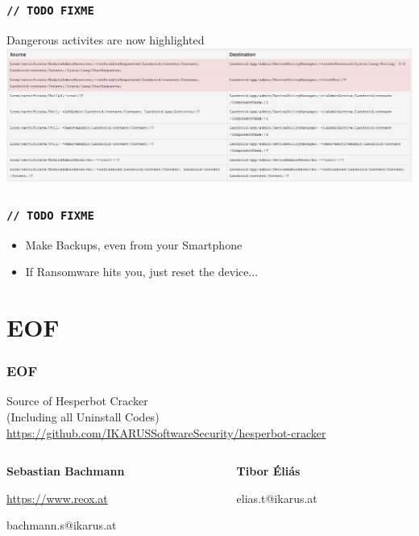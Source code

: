 \documentclass[12pt,a4paper]{beamer}
\begin{document}
\begin{frame}
\frametitle{\texttt{// TODO FIXME}}
Dangerous activites are now highlighted
\includegraphics[width=\textwidth]{images/device-admin-analysis.png}


\end{frame}

\begin{frame}
\frametitle{\texttt{// TODO FIXME}}

\begin{itemize}
	\item Make Backups, even from your Smartphone
	\item If Ransomware hits you, just reset the device...
\end{itemize}

\end{frame}



\section{EOF}

\begin{frame}
\frametitle{EOF}

\centering
Source of Hesperbot Cracker\\
{\footnotesize (Including all Uninstall Codes)}
\small\url{https://github.com/IKARUSSoftwareSecurity/hesperbot-cracker}

\vspace{4em}

  \begin{columns}
    \begin{column}{.5\linewidth}
    \centering
	\textbf{Sebastian Bachmann}
	
	\vspace{1em}
	
	\url{https://www.reox.at}

	\vspace{1em}	
	
	bachmann.s@ikarus.at
    \end{column}
    \begin{column}{.5\linewidth}
    \centering
	\textbf{Tibor Éliás}
	
	\vspace{1em}
	
	\qquad

	\vspace{1em}	
	
	elias.t@ikarus.at
    \end{column}
  \end{columns}
\end{frame}
\end{document}
